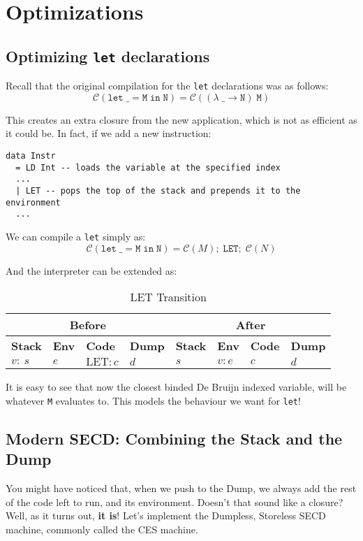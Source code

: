 \section{Optimizations}
\subsection{Optimizing \texttt{let} declarations}
Recall that the original compilation for the \texttt{let} declarations was as follows:
\[ \mathcal{C}(\mathtt{let\; \_ = M\; in\; N}) = \mathcal{C}((\lambda\; \_ \to \mathtt{N})\; \mathtt{M}) \]

This creates an extra closure from the new application, which is not as efficient as it could be.
In fact, if we add a new instruction:
\begin{lstlisting}
data Instr
  = LD Int -- loads the variable at the specified index 
  ...
  | LET -- pops the top of the stack and prepends it to the environment
  ...
\end{lstlisting}

We can compile a \texttt{let} simply as:
\[ \mathcal{C}(\mathtt{let\; \_ = M\; in\; N}) = \mathcal{C}(M);\; \texttt{LET};\; \mathcal{C}(N) \]

And the interpreter can be extended as:

\begin{table}[h]
    \centering
    \small
    \setlength{\tabcolsep}{4pt}
    \begin{tabular}{|l|l|l|l||l|l|l|l|}
        \hline
        \multicolumn{4}{|c||}{\textbf{Before}} & \multicolumn{4}{c|}{\textbf{After}} \\
        \hline
        \textbf{Stack} & \textbf{Env} & \textbf{Code} & \textbf{Dump} & \textbf{Stack} & \textbf{Env} & \textbf{Code} & \textbf{Dump} \\
        \hline
        \( v : \ s \) & \( e \) & \( \text{LET} : c \) & \( d \) & \( s \) & \( v : e \) & \( c \) & \( d \) \\
        \hline
    \end{tabular}
    \caption{LET Transition}
\end{table}

It is easy to see that now the closest binded De Bruijn indexed variable, will be whatever \texttt{M} evaluates to. 
This models the behaviour we want for \texttt{let}!

\subsection{Modern SECD: Combining the Stack and the Dump}
You might have noticed that, when we push to the Dump, we always add the rest of the code left to run, and its environment. 
Doesn't that sound like a closure? Well, as it turns out, \textbf{it is}!
Let's implement the Dumpless, Storeless SECD machine, commonly called the CES machine.

